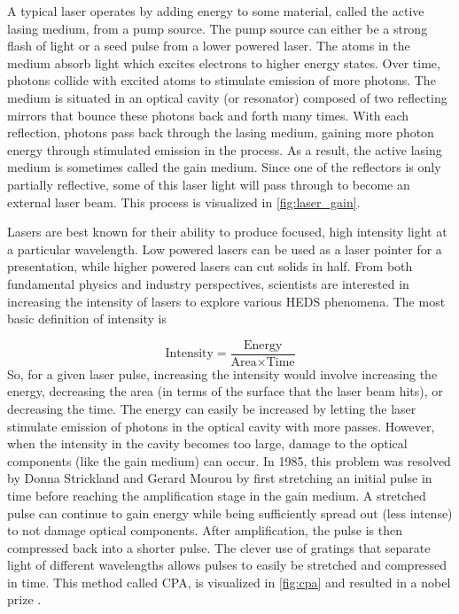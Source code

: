 A typical laser operates by adding energy to some material, called the active lasing medium, from a pump source. The pump source can either be a strong flash of light or a seed pulse from a lower powered laser. The atoms in the medium absorb light which excites electrons to higher energy states. Over time, photons collide with excited atoms to stimulate emission of more photons. The medium is situated in an optical cavity (or resonator) composed of two reflecting mirrors that bounce these photons back and forth many times. With each reflection, photons pass back through the lasing medium, gaining more photon energy through stimulated emission in the process. As a result, the active lasing medium is sometimes called the gain medium. Since one of the reflectors is only partially reflective, some of this laser light will pass through to become an external laser beam. This process is visualized in \autoref{fig:laser_gain}.

Lasers are best known for their ability to produce focused, high intensity light at a particular wavelength. Low powered lasers can be used as a laser pointer for a presentation, while higher powered lasers can cut solids in half. From both fundamental physics and industry perspectives, scientists are interested in increasing the intensity of lasers to explore various \gls{HEDS} phenomena. The most basic definition of intensity is

\begin{equation}
	\text{Intensity} = \frac{\text{Energy}}{\text{Area} \times \text{Time}}	
\end{equation}
So, for a given laser pulse, increasing the intensity would involve increasing the energy, decreasing the area (in terms of the surface that the laser beam hits), or decreasing the time. The energy can easily be increased by letting the laser stimulate emission of photons in the optical cavity with more passes. However, when the intensity in the cavity becomes too large, damage to the optical components (like the gain medium) can occur. In 1985, this problem was resolved by Donna Strickland and Gerard Mourou \cite{Strickland_1985_Optics} by first stretching an initial pulse in time before reaching the amplification stage in the gain medium. A stretched pulse can continue to gain energy while being sufficiently spread out (less intense) to not damage optical components. After amplification, the pulse is then compressed back into a shorter pulse. The clever use of gratings that separate light of different wavelengths allows pulses to easily be stretched and compressed in time. This method called \gls{CPA}, is visualized in \autoref{fig:cpa} and resulted in a nobel prize \cite{Nobel_2018}.

